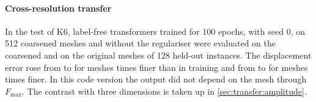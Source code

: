 \paragraph{Cross-resolution transfer}
In the test of K6, label-free transformers trained for 100 epochs, with seed 0, on 512
coarsened meshes and without the regulariser were evaluated on the coarsened and on the
original meshes of 128 held-out instances. The displacement error rose from
\numCoarsenLowCoarse{} to \numCoarsenLowFine{} for meshes \numCoarsenLow{} times finer
than in training and from \numCoarsenHighCoarse{} to \numCoarsenHighFine{} for meshes
\numCoarsenHigh{} times finer. In this code version the output did not depend on the mesh through $F_{\max}$. The contrast with three dimensions is taken up in
\cref{sec:transfer:amplitude}.
